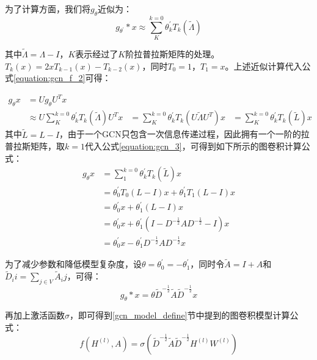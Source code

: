 为了计算方面，我们将$g_\theta$近似为：
\begin{equation}
    g_{\theta^{\prime}} * x \approx \sum_{K}^{k=0} \theta^{\prime}_k T_k (\widetilde{\Lambda})  
    \label{equation:g_approx}
\end{equation}

其中$\widetilde{\Lambda} = \Lambda - I$，$K$表示经过了$K$阶拉普拉斯矩阵的处理。$T_k(x) = 2xT_{k-1}(x) - T_{k-2}(x)$，同时$T_0 = 1$，$T_1 = x$。上述近似计算代入公式\ref{equation:gcn_f_2}可得：

\begin{equation}
    \begin{aligned}
        g_\theta x &= Ug_\theta U^T x \\
        &\approx U \sum_{K}^{k=0} \theta^{\prime}_k T_k (\widetilde{\Lambda}) U^Tx
        &=\sum_{K}^{k=0} \theta^{\prime}_k T_k (U\widetilde{\Lambda}U^T)x
        &=\sum_{K}^{k=0} \theta^{\prime}_k T_k(\widetilde{L})x
    \end{aligned}
    \label{equation:gcn_3}
\end{equation}
其中$\widetilde{L} = L - I$，由于一个GCN只包含一次信息传递过程，因此拥有一个一阶的拉普拉斯矩阵，取$k=1$代入公式\ref{equation:gcn_3}，可得到如下所示的图卷积计算公式：
\begin{equation}
    \begin{aligned}
        g_\theta x &=\sum_{1}^{k=0} \theta^{\prime}_k T_k(\widetilde{L})x \\
        &=\theta^{\prime}_0 T_0(L-I)x + \theta^{\prime}_1 T_1(L-I)x \\ 
        &=\theta^{\prime}_0x + \theta^{\prime}_1(L-I)x\\
        &=\theta^{\prime}_0x + \theta^{\prime}_1(I-D^{-\frac{1}{2}}AD^{-\frac{1}{2}}-I)x\\
        &=\theta^{\prime}_0x - \theta^{\prime}_1 D^{-\frac{1}{2}}AD^{-\frac{1}{2}} x
    \end{aligned}
    \label{equation:gcn_4}
\end{equation}

为了减少参数和降低模型复杂度，设$\theta = \theta^{\prime}_0 = -\theta^{\prime}_1$，同时令$\widetilde{A} = I+A$和$\widetilde{D}_ii = \sum_{j \in V}\widetilde{A}_ij$，可得：
\begin{equation}
        g_\theta * x =\theta \widetilde{D}^{-\frac{1}{2}}\widetilde{A} \widetilde{D}^{-\frac{1}{2}} x
    \label{equation:gcn_5}
\end{equation}

再加上激活函数$\sigma$，即可得到\ref{gcn_model_define}节中提到的图卷积模型计算公式：
\begin{equation}
    f(H^{(l)},A) = \sigma\left( \widetilde{D}^{-\frac{1}{2}} \widetilde{A} \widetilde{D}^{-\frac{1}{2}} H^{(l)}W^{(l)} \right)
    \label{equation:GCN_define_2}
 \end{equation}

